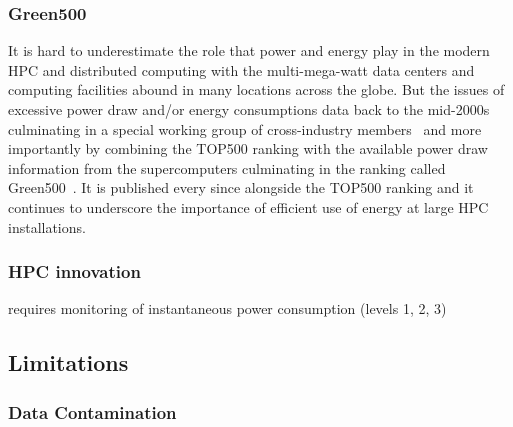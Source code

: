 \subsubsection{Green500}
\label{subsec:benchmarks-hpc-green500}

It is hard to underestimate the role that power and energy play in the
modern HPC and distributed computing with the multi-mega-watt data
centers and computing facilities abound in many locations across the
globe. But the issues of excessive power draw and/or energy consumptions
data back to the mid-2000s~\cite{feng2005pwrprofsciapps,
cameron2005hpcpowerdistcompsciapps} culminating in a special working
group of cross-industry members~\cite{specpower2008, specpower} and more
importantly by combining the TOP500 ranking with the available power
draw information from the supercomputers culminating in the ranking
called Green500~\cite{feng2007green500}. It is published every since
alongside the TOP500 ranking and it continues to underscore the
importance of efficient use of energy at large HPC installations.

\subsubsection{HPC innovation}
\label{subsec:benchmarks-hpc-innov}

requires monitoring of instantaneous power consumption (levels 1, 2, 3)


\subsection{Limitations}
\label{subsec:benchmarks-limits}


\subsubsection{Data Contamination}
\label{subsec:benchmarks-limits-dataContam}

